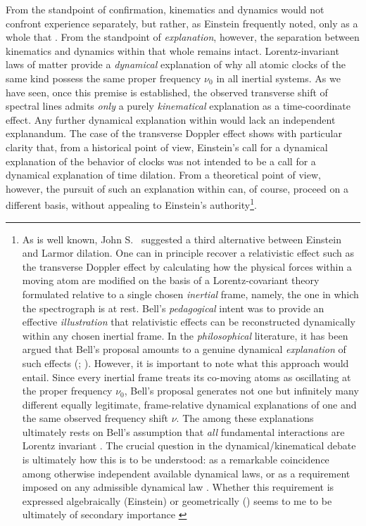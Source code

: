 \documentclass[pdflatex]{sn-jnl}
\newcommand{\tDe}{transverse Doppler effect\xspace}
\begin{document}
From the standpoint of confirmation, kinematics and dynamics would not confront experience separately, but rather, as Einstein frequently noted, only as a whole that  \citep[678]{Einstein1949a}. From the standpoint of \emph{explanation}, however, the separation between kinematics and dynamics within that whole remains intact. Lorentz-invariant laws of matter provide a \emph{dynamical} explanation of why all atomic clocks of the same kind possess the same proper frequency $\nu_0$ in all inertial systems. As we have seen, once this premise is established, the observed transverse shift of spectral lines admits \emph{only} a purely \emph{kinematical} explanation as a time-coordinate effect. Any further dynamical explanation within \sr would lack an independent explanandum. The case of the \tDe shows with particular clarity that, from a historical point of view, Einstein’s call for a dynamical explanation of the behavior of clocks was not intended to be a call for a dynamical explanation of time dilation. From a theoretical point of view, however, the pursuit of such an explanation within \sr can, of course, proceed on a different basis, without appealing to Einstein’s authority\footnote{As is well known, John S.~\citet{Bell1976} suggested a third alternative between Einstein and Larmor dilation. One can in principle recover a relativistic effect such as the \tDe by calculating how the physical forces within a moving atom are modified on the basis of a Lorentz-covariant theory formulated relative to a single chosen \emph{inertial} frame, namely, the one in which the spectrograph is at rest. Bell’s \emph{pedagogical} intent was to provide an effective \emph{illustration} that relativistic effects can be reconstructed dynamically within any chosen inertial frame. In the \emph{philosophical} literature, it has been argued that Bell’s proposal amounts to a genuine dynamical \emph{explanation} of such effects (\citealp{Brown2001}; \citealp[sec.~1.4]{Brown2005}). However, it is important to note what this approach would entail. Since every inertial frame treats its co-moving atoms as oscillating at the proper frequency $\nu_0$, Bell’s proposal generates not one but infinitely many different equally legitimate, frame-relative dynamical explanations of one and the same observed frequency shift $\nu$. The  among these explanations ultimately rests on Bell’s assumption that \emph{all} fundamental interactions are Lorentz invariant \citep[143]{Bell1976}. The crucial question in the dynamical/kinematical debate is ultimately how this  is to be understood: as a remarkable coincidence among otherwise independent available dynamical laws, or as a requirement imposed on any admissible dynamical law \citep{Lange2016}. Whether this requirement is expressed algebraically (Einstein) or geometrically (\Mink) seems to me to be ultimately of secondary importance \citep[see][]{Giovanelli2020a}}.







%
\end{document}
